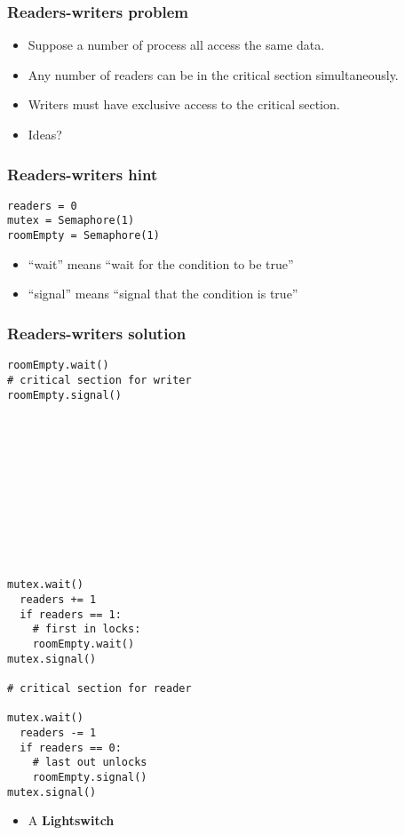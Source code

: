 \documentclass{beamer}
\newcommand{\bi}{\begin{itemize}}
\newcommand{\ii}{\item}
\newcommand{\ei}{\end{itemize}}
\newcommand{\bfr}[1]{\begin{frame}[fragile]\frametitle{{ #1 }}}
\begin{document}
\bfr{Readers-writers problem}
\bi
\ii Suppose a number of process all access the same data.
\ii Any number of readers can be in the critical section
simultaneously.
\ii Writers must have exclusive access to the critical section.
\ii Ideas?
\ei
\end{frame}

\bfr{Readers-writers hint}
\begin{Verbatim}
readers = 0
mutex = Semaphore(1)
roomEmpty = Semaphore(1)
\end{Verbatim}

\bi
\ii ``wait'' means ``wait for the condition to be true''
\ii ``signal'' means ``signal that the condition is true''
\ei
\end{frame}

\bfr{Readers-writers solution}
\begin{multicols}{2}
\begin{Verbatim}[label=Writers]
roomEmpty.wait()
# critical section for writer
roomEmpty.signal()












\end{Verbatim}
\begin{Verbatim}[label=Readers]
mutex.wait()
  readers += 1
  if readers == 1:
    # first in locks:
    roomEmpty.wait()
mutex.signal()

# critical section for reader

mutex.wait()
  readers -= 1
  if readers == 0:
    # last out unlocks
    roomEmpty.signal()
mutex.signal()
\end{Verbatim}
\end{multicols}

\bi
\ii A {\bf Lightswitch}
\ei

\end{frame}
\end{document}
